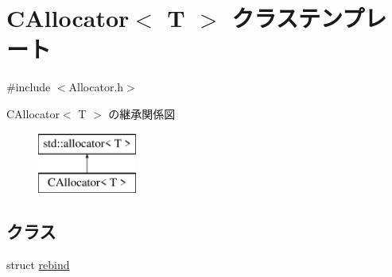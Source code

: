 \hypertarget{class_c_allocator}{}\section{C\+Allocator$<$ T $>$ クラステンプレート}
\label{class_c_allocator}


{\ttfamily \#include $<$Allocator.\+h$>$}

C\+Allocator$<$ T $>$ の継承関係図\begin{figure}[H]
\begin{center}
\leavevmode
\includegraphics[height=2.000000cm]{class_c_allocator}
\end{center}
\end{figure}
\subsection*{クラス}
\begin{DoxyCompactItemize}
\item 
struct \hyperlink{struct_c_allocator_1_1rebind}{rebind}
\end{DoxyCompactItemize}
